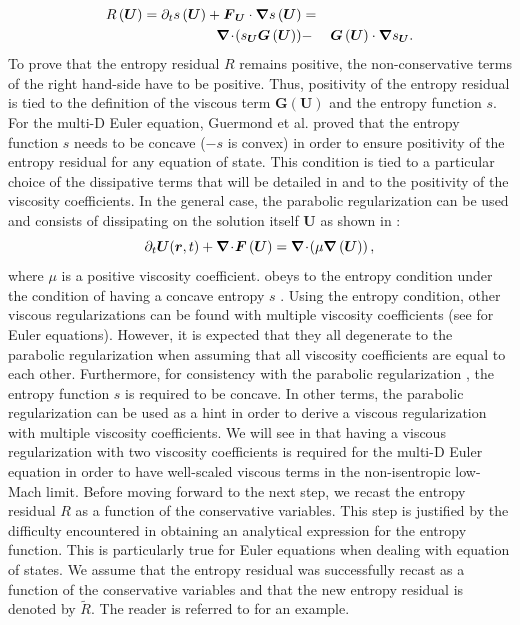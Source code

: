 \begin{enumerate}
\begin{eqnarray}
R\left(\boldsymbol{U}\right) = \partial_t s\left(\boldsymbol{U}\right) + \boldsymbol{F}_{\boldsymbol{U}} \cdot \boldsymbol{\nabla} s \left(\boldsymbol{U}\right) &=& \nonumber \\
\boldsymbol{\nabla}\! \cdot \! ( s_{\boldsymbol{U}} \boldsymbol{G}  \left( \boldsymbol{U} \right) ) &-& \boldsymbol{G}  \left( \boldsymbol{U} \right) \cdot \boldsymbol{\nabla} s_{\boldsymbol{U}}.
\end{eqnarray}
%
To prove that the entropy residual $R$ remains positive, the non-conservative terms of the right hand-side have to be positive. Thus, positivity of the entropy residual is tied to the definition of the viscous term $\boldsymbol{G}  \left( \boldsymbol{U} \right)$ and the entropy function $s$. For the multi-D Euler equation, Guermond et al. \cite{jlg} proved that the entropy function $s$ needs to be concave ($-s$ is convex) in order to ensure positivity of the entropy residual for any equation of state. This condition is tied to a particular choice of the dissipative terms that will be detailed in  and to the positivity of the viscosity coefficients. In the general case, the parabolic regularization \cite{Parabolic} can be used and consists of dissipating on the solution itself  $\boldsymbol{U}$ as shown in : 
%
\begin{equation}\label{eq:hyp_syst4_sct1b}
\partial_t \boldsymbol{U}(\boldsymbol r,t) + \boldsymbol{\nabla}\! \cdot \! \boldsymbol{F} \left( \boldsymbol{U} \right) = \boldsymbol{\nabla}\! \cdot \! \left( \mu \boldsymbol{\nabla} \left( \boldsymbol{U} \right) \right),
\end{equation}
%
where $\mu$ is a positive viscosity coefficient.  obeys to the entropy condition under the condition of having a concave entropy $s$ \cite{Parabolic}. Using the entropy condition, other viscous regularizations can be found with multiple viscosity coefficients (see \cite{jlg} for Euler equations). However, it is expected that they all degenerate to the parabolic regularization when assuming that all viscosity coefficients are equal to each other. Furthermore, for consistency with the parabolic regularization \cite{Parabolic}, the entropy function $s$ is required to be concave. In other terms, the parabolic regularization can be used as a hint in order to derive a viscous regularization with multiple viscosity coefficients. We will see in  that having a viscous regularization with two viscosity coefficients is required for the multi-D Euler equation in order to have well-scaled viscous terms in the non-isentropic low-Mach limit. Before moving forward to the next step, we recast the entropy residual $R$ as a function of the conservative variables. This step is justified by the difficulty encountered in obtaining an analytical expression for the entropy function. This is particularly true for Euler equations when dealing with equation of states. We assume that the entropy residual was successfully recast as a function of the conservative variables and that the new entropy residual is denoted by $\tilde{R}$. The reader is referred to  for an example.

\end{enumerate}
